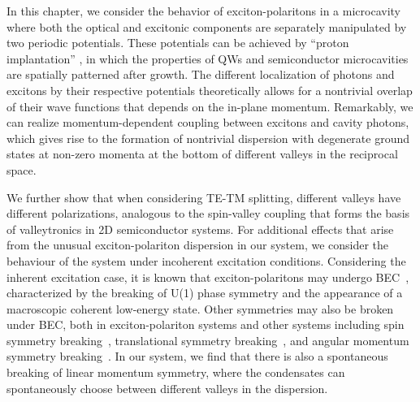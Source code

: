 In this chapter, we consider the behavior of exciton-polaritons in a microcavity where both the optical and excitonic components are separately manipulated by two periodic potentials.
These potentials can be achieved by ``proton implantation'' \cite{Schneider:2016aa}, in which the properties of QWs and semiconductor microcavities are spatially patterned after growth.
The different localization of photons and excitons by their respective potentials theoretically allows for a nontrivial overlap of their wave functions that depends on the in-plane momentum.
Remarkably, we can realize momentum-dependent coupling between excitons and cavity photons, which gives rise to the formation of nontrivial dispersion with degenerate ground states at non-zero momenta at the bottom of different valleys in the reciprocal space.

We further show that when considering TE-TM splitting, different valleys have different polarizations, analogous to the spin-valley coupling that forms the basis of valleytronics in 2D semiconductor systems.
For additional effects that arise from the unusual exciton-polariton dispersion in our system, we consider the behaviour of the system under incoherent excitation conditions.
Considering the inherent excitation case, it is known that exciton-polaritons may undergo BEC~\cite{Kasprzak:2006aa}, characterized by the breaking of U(1) phase symmetry and the appearance of a macroscopic coherent low-energy state.
Other symmetries may also be broken under BEC, both in exciton-polariton systems and other systems including spin symmetry breaking~\cite{Sadler:2006aa,Ohadi:2012aa}, translational symmetry breaking~\cite{Kanamoto:2003aa}, and angular momentum symmetry breaking~\cite{Butts:1999aa,Liu:2015aa}.
In our system, we find that there is also a spontaneous breaking of linear momentum symmetry, where the condensates can spontaneously choose between different valleys in the dispersion.

%
%
